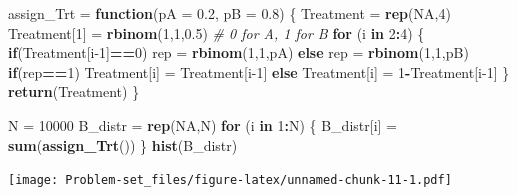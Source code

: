 \documentclass[]{article}
\newenvironment{Shaded}{\begin{snugshade}}{\end{snugshade}}
\newcommand{\CommentTok}[1]{\textcolor[rgb]{0.56,0.35,0.01}{\textit{#1}}}
\newcommand{\ControlFlowTok}[1]{\textcolor[rgb]{0.13,0.29,0.53}{\textbf{#1}}}
\newcommand{\DataTypeTok}[1]{\textcolor[rgb]{0.13,0.29,0.53}{#1}}
\newcommand{\DecValTok}[1]{\textcolor[rgb]{0.00,0.00,0.81}{#1}}
\newcommand{\FloatTok}[1]{\textcolor[rgb]{0.00,0.00,0.81}{#1}}
\newcommand{\KeywordTok}[1]{\textcolor[rgb]{0.13,0.29,0.53}{\textbf{#1}}}
\newcommand{\NormalTok}[1]{#1}
\newcommand{\OperatorTok}[1]{\textcolor[rgb]{0.81,0.36,0.00}{\textbf{#1}}}
\newcommand{\OtherTok}[1]{\textcolor[rgb]{0.56,0.35,0.01}{#1}}
\newcommand{\StringTok}[1]{\textcolor[rgb]{0.31,0.60,0.02}{#1}}
\begin{document}
\begin{Shaded}
\begin{Highlighting}[]
\NormalTok{assign_Trt =}\StringTok{ }\ControlFlowTok{function}\NormalTok{(}\DataTypeTok{pA =} \FloatTok{0.2}\NormalTok{, }\DataTypeTok{pB =} \FloatTok{0.8}\NormalTok{) \{}
\NormalTok{  Treatment =}\StringTok{ }\KeywordTok{rep}\NormalTok{(}\OtherTok{NA}\NormalTok{,}\DecValTok{4}\NormalTok{)}
\NormalTok{  Treatment[}\DecValTok{1}\NormalTok{] =}\StringTok{ }\KeywordTok{rbinom}\NormalTok{(}\DecValTok{1}\NormalTok{,}\DecValTok{1}\NormalTok{,}\FloatTok{0.5}\NormalTok{) }\CommentTok{# 0 for A, 1 for B}
  \ControlFlowTok{for}\NormalTok{ (i }\ControlFlowTok{in} \DecValTok{2}\OperatorTok{:}\DecValTok{4}\NormalTok{) \{}
    \ControlFlowTok{if}\NormalTok{(Treatment[i}\DecValTok{-1}\NormalTok{]}\OperatorTok{==}\DecValTok{0}\NormalTok{)}
\NormalTok{      rep =}\StringTok{ }\KeywordTok{rbinom}\NormalTok{(}\DecValTok{1}\NormalTok{,}\DecValTok{1}\NormalTok{,pA)}
    \ControlFlowTok{else}
\NormalTok{      rep =}\StringTok{ }\KeywordTok{rbinom}\NormalTok{(}\DecValTok{1}\NormalTok{,}\DecValTok{1}\NormalTok{,pB)}
    \ControlFlowTok{if}\NormalTok{(rep}\OperatorTok{==}\DecValTok{1}\NormalTok{)}
\NormalTok{      Treatment[i] =}\StringTok{ }\NormalTok{Treatment[i}\DecValTok{-1}\NormalTok{]}
    \ControlFlowTok{else}
\NormalTok{      Treatment[i] =}\StringTok{ }\DecValTok{1}\OperatorTok{-}\NormalTok{Treatment[i}\DecValTok{-1}\NormalTok{]}
\NormalTok{  \}}
  \KeywordTok{return}\NormalTok{(Treatment)}
\NormalTok{\}}
\end{Highlighting}
\end{Shaded}

\begin{Shaded}
\begin{Highlighting}[]
\NormalTok{N =}\StringTok{ }\DecValTok{10000}
\NormalTok{B_distr =}\StringTok{ }\KeywordTok{rep}\NormalTok{(}\OtherTok{NA}\NormalTok{,N)}
\ControlFlowTok{for}\NormalTok{ (i }\ControlFlowTok{in} \DecValTok{1}\OperatorTok{:}\NormalTok{N) \{}
\NormalTok{  B_distr[i] =}\StringTok{ }\KeywordTok{sum}\NormalTok{(}\KeywordTok{assign_Trt}\NormalTok{())}
\NormalTok{\}}
\KeywordTok{hist}\NormalTok{(B_distr)}
\end{Highlighting}
\end{Shaded}

\texttt{[image: Problem-set\_files/figure-latex/unnamed-chunk-11-1.pdf]}
\end{document}
